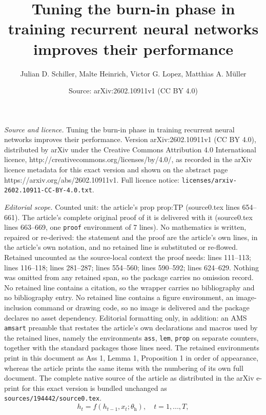 \documentclass[10pt,a4paper]{amsart}
\title{Tuning the burn-in phase in training recurrent neural networks improves their performance}
\author{Julian D. Schiller, Malte Heinrich, Victor G. Lopez, Matthias A. M\"uller}
\date{Source: arXiv:2602.10911v1 (CC BY 4.0)}
\begin{document}
\maketitle

\noindent\emph{Source and licence.} Tuning the burn-in phase in training recurrent neural networks improves their performance. Version arXiv:2602.10911v1 (CC BY 4.0), distributed by arXiv under the Creative Commons Attribution 4.0 International licence, http://creativecommons.org/licenses/by/4.0/, as recorded in the arXiv licence metadata for this exact version and shown on the abstract page https://arxiv.org/abs/2602.10911v1. Full licence notice: \texttt{licenses/arxiv-2602.10911-CC-BY-4.0.txt}.\par\smallskip

\noindent\textit{Editorial scope.} Counted unit: the article's prop prop:TP (source0.tex lines 654--661). The article's complete original proof of it is delivered with it (source0.tex lines 663--669, one \texttt{proof} environment of 7 lines). No mathematics is written, repaired or re-derived: the statement and the proof are the article's own lines, in the article's own notation, and no retained line is substituted or re-flowed.  Retained uncounted as the source-local context the proof needs: lines 111--113; lines 116--118; lines 281--287; lines 554--560; lines 590--592; lines 624--629.  Nothing was omitted from any retained span, so the package carries no omission record.  No retained line contains a citation, so the wrapper carries no bibliography and no bibliography entry.  No retained line contains a figure environment, an image-inclusion command or drawing code, so no image is delivered and the package declares no asset dependency.  Editorial formatting only, in addition: an AMS \texttt{amsart} preamble that restates the article's own declarations and macros used by the retained lines, namely the environments \texttt{ass}, \texttt{lem}, \texttt{prop} on separate counters, together with the standard packages those lines need.  The retained environments print in this document as Ass 1, Lemma 1, Proposition 1 in order of appearance, whereas the article prints the same items with the numbering of its own full document.  The complete native source of the article as distributed in the arXiv e-print for this exact version is bundled unchanged as \texttt{sources/194442/source0.tex}.
\begin{equation}\label{eq:RNN_1}
	h_{t} = f(h_{t-1},x_t;\theta_\mathrm{h}), \quad t = 1,...,T,
\end{equation}
\end{document}
